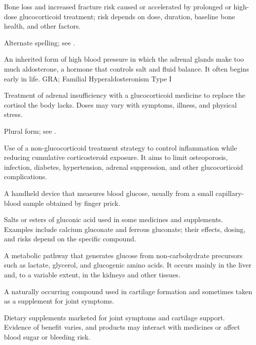  Bone loss and increased fracture risk caused or accelerated by prolonged or high-dose glucocorticoid treatment; risk depends on dose, duration, baseline bone health, and other factors.

 Alternate spelling; see .

 An inherited form of high blood pressure in which the adrenal glands make too much aldosterone, a hormone that controls salt and fluid balance. It often begins early in life.
\synonyms
GRA; Familial Hyperaldosteronism Type I

 Treatment of adrenal insufficiency with a glucocorticoid medicine to replace the cortisol the body lacks. Doses may vary with symptoms, illness, and physical stress.

 Plural form; see .

 Use of a non-glucocorticoid treatment strategy to control inflammation while reducing
cumulative corticosteroid exposure. It aims to limit osteoporosis, infection, diabetes,
hypertension, adrenal suppression, and other glucocorticoid complications.

 A handheld device that measures blood glucose, usually from a small capillary-blood sample obtained by finger prick.

 Salts or esters of gluconic acid used in some medicines and supplements. Examples include calcium gluconate and ferrous gluconate; their effects, dosing, and risks depend on the specific compound.

 A metabolic pathway that generates glucose from non-carbohydrate precursors such as lactate, glycerol, and glucogenic amino acids. It occurs mainly in the liver and, to a variable extent, in the kidneys and other tissues.

 A naturally occurring compound used in cartilage formation and sometimes taken as a supplement for joint symptoms.

 Dietary supplements marketed for joint symptoms and cartilage support. Evidence of benefit varies, and products may interact with medicines or affect blood sugar or bleeding risk.

